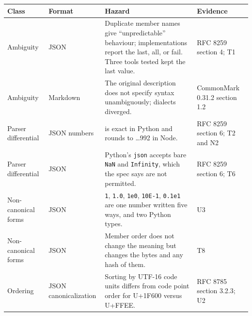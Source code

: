 \documentclass[10pt,letterpaper]{article}
\newcounter{none}
\begin{document}
{\def\LTcaptype{none} %
{\footnotesize\setlength{\tabcolsep}{3.8pt}\renewcommand{\arraystretch}{1.15}
\begin{longtable}[]{@{}
  >{\raggedright\arraybackslash}p{}
  >{\raggedright\arraybackslash}p{}
  >{\raggedright\arraybackslash}p{}
  >{\raggedright\arraybackslash}p{}@{}}
\toprule\noalign{}
\begin{minipage}[b]{\linewidth}\raggedright
\textbf{Class}
\end{minipage} & \begin{minipage}[b]{\linewidth}\raggedright
\textbf{Format}
\end{minipage} & \begin{minipage}[b]{\linewidth}\raggedright
\textbf{Hazard}
\end{minipage} & \begin{minipage}[b]{\linewidth}\raggedright
\textbf{Evidence}
\end{minipage} \\
\midrule\noalign{}
\endhead
\bottomrule\noalign{}
\endlastfoot
Ambiguity & JSON & Duplicate member names give ``unpredictable''
behaviour; implementations report the last, all, or fail. Three tools
tested kept the last value. & RFC 8259 section 4; T1 \\
Ambiguity & Markdown & The original description does not specify syntax
unambiguously; dialects diverged. & CommonMark 0.31.2 section 1.2 \\
Parser differential & JSON numbers & 9007199254740993 is exact in Python
and rounds to \ldots992 in Node. & RFC 8259 section 6; T2 and N2 \\
Parser differential & JSON & Python's \texttt{json} accepts bare
\texttt{NaN} and \texttt{Infinity}, which the spec says are not
permitted. & RFC 8259 section 6; T6 \\
Non-canonical forms & JSON & \texttt{1}, \texttt{1.0}, \texttt{1e0},
\texttt{10E-1}, \texttt{0.1e1} are one number written five ways, and two
Python types. & U3 \\
Non-canonical forms & JSON & Member order does not change the meaning
but changes the bytes and any hash of them. & T8 \\
Ordering & JSON canonicalization & Sorting by UTF-16 code units differs
from code point order for U+1F600 versus U+FFEE. & RFC 8785 section
3.2.3; U2 \\

\end{longtable}}}
\end{document}

